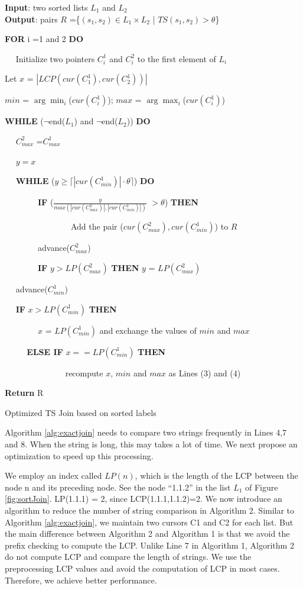 \begin{algorithm}
{\bf Input}: two sorted lists  $L_1$ and $L_2$\\
{\bf Output}: pairs $R$ =\{$(s_1,s_2) \in L_1 \times L_2$ | $TS(s_1, s_2) > \theta$\}
\begin{compactenum}[(1)]
\item {\bf FOR}  i =1 and 2 {\bf DO}
\item ~~ Initialize two pointers $C_i^1$ and $C_i^2$ to the first element of  $L_i$
\item Let $x$ = $|LCP(cur(C_1^1),cur(C_2^1))|$
\item $min$ = $\arg\min_{i}$($cur(C_i^1)$); $max$ = $\arg\max_{i}$($cur(C_i^1)$)
\item {\bf WHILE}  ($\neg$end($L_1$) and $\neg$end($L_2$)) {\bf DO}
\item ~~ $C_{max}^2$ =$C_{max}^1$
\item ~~ $y = x$
\item ~~ {\bf WHILE} ($y \geq \lceil |cur(C_{min}^1)| \cdot \theta  \rceil$) {\bf DO}
\item ~~ ~~ ~~ {\bf IF} ($\frac{y}{max(|cur(C_{max}^2)|,|cur(C_{min}^1)|)}$ $> \theta$) {\bf THEN}
\item ~~ ~~ ~~ ~~ ~~ ~~ Add  the pair ($cur(C_{max}^2),cur(C_{min}^1)$) to $R$
\item ~~ ~~ ~~  advance($C_{max}^2$)
\item ~~ ~~ ~~ {\bf IF} $y > LP(C_{max}^2)$  {\bf THEN} $y$ = $LP(C_{max}^2)$
\item ~~ advance($C_{min}^1$)
\item ~~  {\bf IF} $x > LP(C_{min}^1)$  {\bf THEN}
\item ~~ ~~ ~~ $x$ = $LP(C_{min}^1)$ and exchange the values of $min$ and $max$
\item ~~ ~~ {\bf ELSE IF}  $x == LP(C_{min}^1)$  {\bf THEN}
\item ~~ ~~~~ ~~~~ ~~ recompute $x$, $min$ and $max$ as Lines (3) and (4)
\item {\bf Return} R
\end{compactenum}
\caption{Optimized TS Join based on sorted labels}
\label{alg:LCPSortJoin}
\end{algorithm}


 Algorithm \ref{alg:exactjoin} needs to compare two strings frequently  in Lines 4,7 and 8. When the string is long, this may takes a lot of time. We next propose an optimization to speed up this processing.

 We employ an index called  $LP(n)$, which is the length of the LCP between the node n and its preceding node. See the node ``1.1.2'' in the list $L_1$ of Figure \ref{fig:sortJoin}. LP(1.1.1) = 2, since LCP(1.1.1,1.1.2)=2.  We now introduce an algorithm to reduce the number of string comparison in Algorithm 2. Similar to Algorithm \ref{alg:exactjoin}, we maintain two cursors C1 and C2 for each list. But the main difference between Algorithm 2 and Algorithm 1 is that we avoid the prefix checking to compute the LCP. Unlike Line 7 in Algorithm 1, Algorithm 2 do not compute LCP and compare the length of strings. We use the preprocessing LCP values and avoid the computation of LCP in most cases. Therefore, we achieve better performance.
 
